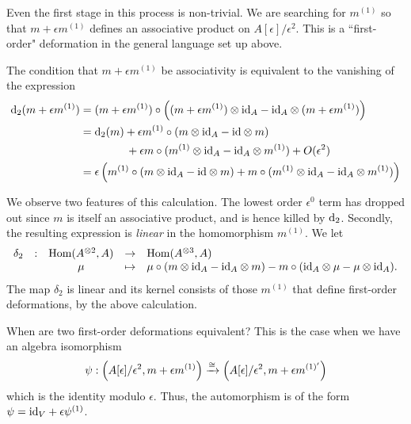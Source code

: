 \documentclass[11pt]{amsart}
\begin{document}
Even the first stage in this process is non-trivial. 
We are searching for $m^{(1)}$ so that $m + \epsilon m^{(1)}$ defines an associative product on $A[\epsilon]/\epsilon^2$. 
This is a ``first-order" deformation in the general language set up above.

The condition that $m + \epsilon m^{(1)}$ be associativity is equivalent to the vanishing of the expression
\begin{align*}
{\rm d}_2(m + \epsilon m^{(1)}) & = (m + \epsilon m^{(1)}) \circ \left((m + \epsilon m^{(1)}) \otimes {\rm id}_A - {\rm id}_A \otimes (m + \epsilon m^{(1)})\right) \\ & = {\rm d}_2(m) + \epsilon m^{(1)} \circ (m \otimes {\rm id}_A - {\rm id} \otimes m) \\ 
& \;\;\;\;\;\;\;\;\;\;\;\;\;\;\; + \epsilon m \circ (m^{(1)} \otimes {\rm id}_A - {\rm id}_A \otimes m^{(1)}) + O(\epsilon^2) \\ & = 
\epsilon \left(m^{(1)} \circ (m \otimes {\rm id}_A - {\rm id} \otimes m) + m \circ (m^{(1)} \otimes {\rm id}_A - {\rm id}_A \otimes m^{(1)})\right)
\end{align*}

We observe two features of this calculation. 
The lowest order $\epsilon^0$ term has dropped out since $m$ is itself an associative product, and is hence killed by ${\rm d}_2$. 
Secondly, the resulting expression is {\em linear} in the homomorphism $m^{(1)}$. 
We let 
\[
\begin{array}{ccccl}
\delta_2 & : & {\rm Hom}(A^{\otimes 2}, A) & \to & {\rm Hom}(A^{\otimes 3}, A) \\
 & & \mu & \mapsto & \mu \circ (m \otimes {\rm id}_A - {\rm id}_A \otimes m) - m \circ ({\rm id}_A \otimes \mu - \mu \otimes {\rm id}_A) .
\end{array}
\]
The map $\delta_2$ is linear and its kernel consists of those $m^{(1)}$ that define first-order deformations, by the above calculation.

When are two first-order deformations equivalent? 
This is the case when we have an algebra isomorphism
\[
\psi : \left(A[\epsilon]/\epsilon^2, m + \epsilon m^{(1)}\right) \xrightarrow{\cong} \left(A[\epsilon]/\epsilon^2, m + \epsilon m^{(1)'}\right)
\]
which is the identity modulo $\epsilon$.
Thus, the automorphism is of the form $\psi = {\rm id}_V + \epsilon \psi^{(1)}$.
\end{document}
